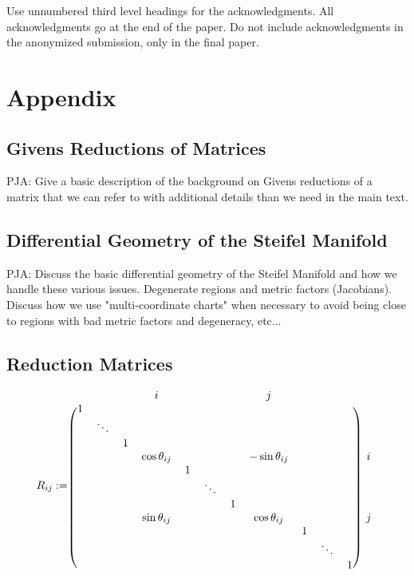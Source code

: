 \documentclass{article}
\newcommand{\commentPJA}[1]{{\textcolor{commentPJA_color}{PJA: #1}}}
\begin{document}
Use unnumbered third level headings for the acknowledgments. All
acknowledgments go at the end of the paper. Do not include
acknowledgments in the anonymized submission, only in the final paper.


\section*{Appendix}


\subsection{Givens Reductions of Matrices}

\commentPJA{Give a basic description of the background on Givens reductions of a matrix that we can refer to with additional details than we need in the main text.}


\subsection{Differential Geometry of the Steifel Manifold}

\commentPJA{Discuss the basic differential geometry of the Steifel Manifold and how we handle these various issues.  Degenerate regions and metric factors (Jacobians).  Discuss how we use "multi-coordinate charts" when necessary to avoid being close to regions with bad metric factors and degeneracy, etc...}


\subsection{Reduction Matrices}

\[
R_{ij} := 
\begin{blockarray}{cccccccccccc}
 & & & i &  & & & j & & \\
\begin{block}{(ccccccccccc)c}
  1 &  &  &  &  & & & &  & & &  \\
   & \ddots &  &  & & & & &  & & &  \\
   &  & 1  &  &  & & & &  & & & \\
   & & & \cos \theta_{ij} &  & &  & -\sin \theta_{ij} &  & & & i \\
   & & & & 1  & &  & &  & & & \\
   & & &  & & \ddots  &  & &  & & &  \\
   & & &  & & & 1 & &  & & &  \\
   & & & \sin \theta_{ij}  &  & &  & \cos \theta_{ij} &  & & & j \\
   & & &  &  & &  & & 1 & & & \\
   & & &  &  & &  & & & \ddots & & \\
      & & &  &  & &  & & & & 1 & \\
\end{block}
\end{blockarray}
 \]
\end{document}
